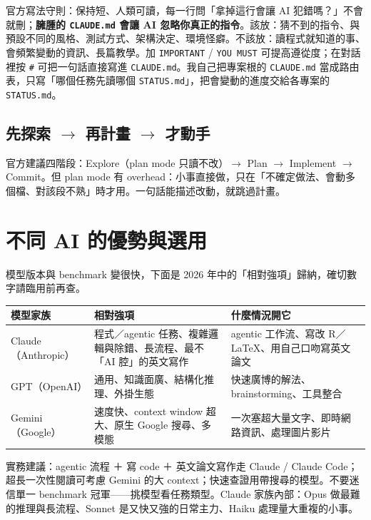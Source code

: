 \documentclass[12pt, a4paper]{article}
\begin{document}
官方寫法守則：保持短、人類可讀，每一行問「拿掉這行會讓 AI 犯錯嗎？」不會就刪；\textbf{臃腫的 \texttt{CLAUDE.md} 會讓 AI 忽略你真正的指令}。該放：猜不到的指令、與預設不同的風格、測試方式、架構決定、環境怪癖。不該放：讀程式就知道的事、會頻繁變動的資訊、長篇教學。加 \texttt{IMPORTANT} / \texttt{YOU MUST} 可提高遵從度；在對話裡按 \texttt{\#} 可把一句話直接寫進 \texttt{CLAUDE.md}。我自己把專案根的 \texttt{CLAUDE.md} 當成路由表，只寫「哪個任務先讀哪個 \texttt{STATUS.md}」，把會變動的進度交給各專案的 \texttt{STATUS.md}。

\subsection{先探索 $\rightarrow$ 再計畫 $\rightarrow$ 才動手}

官方建議四階段：Explore（plan mode 只讀不改）$\rightarrow$ Plan $\rightarrow$ Implement $\rightarrow$ Commit。但 plan mode 有 overhead：小事直接做，只在「不確定做法、會動多個檔、對該段不熟」時才用。一句話能描述改動，就跳過計畫。

\section{不同 AI 的優勢與選用}

模型版本與 benchmark 變很快，下面是 2026 年中的「相對強項」歸納，確切數字請臨用前再查。

\begin{table}[h]
\centering
\begin{tabularx}{\linewidth}{lYY}
\toprule
模型家族 & 相對強項 & 什麼情況開它 \\
\midrule
Claude（Anthropic） & 程式／agentic 任務、複雜邏輯與除錯、長流程、最不「AI 腔」的英文寫作 & agentic 工作流、寫改 R／LaTeX、用自己口吻寫英文論文 \\
GPT（OpenAI） & 通用、知識面廣、結構化推理、外掛生態 & 快速廣博的解法、brainstorming、工具整合 \\
Gemini（Google） & 速度快、context window 超大、原生 Google 搜尋、多模態 & 一次塞超大量文字、即時網路資訊、處理圖片影片 \\
\bottomrule
\end{tabularx}
\end{table}

實務建議：agentic 流程 ＋ 寫 code ＋ 英文論文寫作走 Claude / Claude Code；超長一次性閱讀可考慮 Gemini 的大 context；快速查證用帶搜尋的模型。不要迷信單一 benchmark 冠軍——挑模型看任務類型。Claude 家族內部：Opus 做最難的推理與長流程、Sonnet 是又快又強的日常主力、Haiku 處理量大重複的小事。
\end{document}
